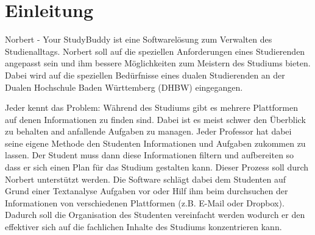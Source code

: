 
\chapter{Einleitung}
Norbert - Your StudyBuddy ist eine Softwarelösung zum Verwalten des Studienalltags. Norbert soll auf die speziellen Anforderungen eines Studierenden angepasst sein und ihm bessere Möglichkeiten zum Meistern des Studiums bieten. Dabei wird auf die speziellen Bedürfnisse eines dualen Studierenden an der Dualen Hochschule Baden Württemberg (DHBW) eingegangen.

Jeder kennt das Problem: Während des Studiums gibt es mehrere Plattformen auf denen Informationen zu finden sind. 
Dabei ist es meist schwer den Überblick zu behalten and anfallende Aufgaben zu managen.
Jeder Professor hat dabei seine eigene Methode den Studenten Informationen und Aufgaben zukommen zu lassen. Der Student muss dann diese Informationen filtern und aufbereiten so dass er sich einen Plan für das Studium gestalten kann.
Dieser Prozess soll durch Norbert unterstützt werden. 
Die Software schlägt dabei dem Studenten auf Grund einer Textanalyse Aufgaben vor oder Hilf ihm beim durchsuchen der Informationen von verschiedenen Plattformen (z.B. E-Mail oder Dropbox).
Dadurch soll die Organisation des Studenten vereinfacht werden wodurch er den effektiver sich auf die fachlichen Inhalte des Studiums konzentrieren kann.


